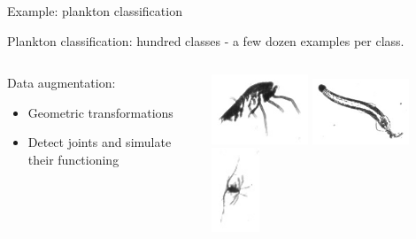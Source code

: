 \documentclass[xcolor=pdftex,dvipsnames,table,mathserif]{beamer}
\begin{document}


\begin{frame}{Example: plankton classification}

Plankton classification: hundred classes - a few dozen examples per class.
\vspace{2em}
\begin{columns}
  \begin{column}{.5\textwidth}
    Data augmentation:
    \begin{itemize}
    \item Geometric transformations
    \item Detect joints and simulate their functioning
    \end{itemize}
  \end{column}

  \begin{column}{.5\textwidth}
  \includegraphics[width=0.4\textwidth]{kaggle_amphipod}
  \includegraphics[width=0.4\textwidth]{kaggle_chaetognath}
  \includegraphics[width=0.2\textwidth]{kaggle_copepod}
  \end{column}
\end{columns}




\end{frame}
\end{document}
